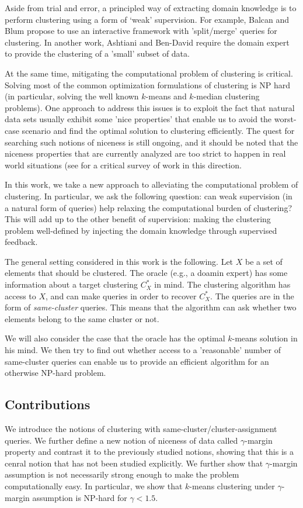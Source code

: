 \documentclass[orivec]{llncs}
\begin{document}
Aside from trial and error, a principled way of extracting domain knowledge is to perform clustering using a form of `weak' supervision.  For example, Balcan and Blum \cite{balcan2008clustering} propose to use an interactive framework with 'split/merge' queries for clustering. In another work, Ashtiani and Ben-David \cite{ashtiani2015representation} require the domain expert to provide the clustering of a 'small' subset of data.

At the same time, mitigating the computational problem of clustering is critical. Solving most of the common optimization formulations of clustering is NP hard (in particular, solving the well known $k$-means and $k$-median clustering problems). One approach to address this issues is to exploit the fact that natural data sets usually exhibit some 'nice properties' that enable us to avoid the worst-case scenario and find the optimal solution to clustering efficiently. The quest for searching such notions of niceness is still ongoing, and it should be noted that the niceness properties that are currently analyzed are too strict to happen in real world situations (see \cite{Ben-David15} for a critical survey of work in this direction.

In this work, we take a new approach to alleviating the computational problem of clustering. In particular, we ask the following question: can weak supervision (in a natural form of queries) help relaxing the computational burden of clustering? This will add up to the other benefit of supervision: making the clustering problem well-defined by injecting the domain knowledge through supervised feedback.

The general setting considered in this work is the following. Let $X$ be a set of elements that should be clustered. The oracle (e.g., a doamin expert) has some information about a  target clustering $C^*_X$ in mind. The clustering algorithm has access to $X$, and can make queries in order to recover $C^*_X$. The queries are in the form of \emph{same-cluster} queries. This means that the algorithm can ask whether two elements belong to the same cluster or not.

We will also consider the case that the oracle has the optimal $k$-means solution in his mind. We then try to find out whether access to a 'reasonable' number of same-cluster queries can enable us to provide an efficient algorithm for an otherwise NP-hard problem. 


\subsection{Contributions}
We introduce the notions of clustering with same-cluster/cluster-assignment queries. We further define a new notion of niceness of data called $\gamma$-margin property and contrast it to the previously studied notions, showing that this is a cenral notion that has not been studied explicitly. We further show that $\gamma$-margin assumption is not necessarily strong enough to make the problem computationally easy. In particular, we show that $k$-means clustering under $\gamma$-margin assumption is NP-hard for $\gamma < 1.5$.
\end{document}
